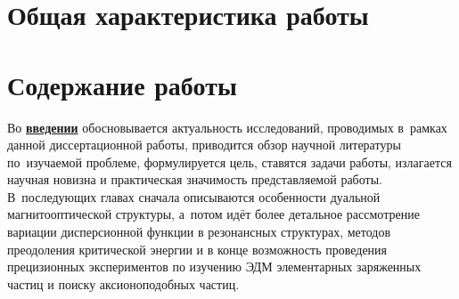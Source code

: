 \section*{Общая характеристика работы}

\newcommand{\actuality}{\pdfbookmark[1]{Актуальность}{actuality}\underline{\textbf{\actualityTXT}}}
\newcommand{\progress}{\pdfbookmark[1]{Разработанность темы}{progress}\underline{\textbf{\progressTXT}}}
\newcommand{\aim}{\pdfbookmark[1]{Цели}{aim}\underline{{\textbf\aimTXT}}}
\newcommand{\tasks}{\pdfbookmark[1]{Задачи}{tasks}\underline{\textbf{\tasksTXT}}}
\newcommand{\aimtasks}{\pdfbookmark[1]{Цели и задачи}{aimtasks}\aimtasksTXT}
\newcommand{\novelty}{\pdfbookmark[1]{Научная новизна}{novelty}\underline{\textbf{\noveltyTXT}}}
\newcommand{\influence}{\pdfbookmark[1]{Практическая значимость}{influence}\underline{\textbf{\influenceTXT}}}
\newcommand{\methods}{\pdfbookmark[1]{Методология и методы исследования}{methods}\underline{\textbf{\methodsTXT}}}
\newcommand{\defpositions}{\pdfbookmark[1]{Положения, выносимые на защиту}{defpositions}\underline{\textbf{\defpositionsTXT}}}
\newcommand{\reliability}{\pdfbookmark[1]{Достоверность}{reliability}\underline{\textbf{\reliabilityTXT}}}
\newcommand{\probation}{\pdfbookmark[1]{Апробация}{probation}\underline{\textbf{\probationTXT}}}
\newcommand{\contribution}{\pdfbookmark[1]{Личный вклад}{contribution}\underline{\textbf{\contributionTXT}}}
\newcommand{\publications}{\pdfbookmark[1]{Публикации}{publications}\underline{\textbf{\publicationsTXT}}}




\section*{Содержание работы}
Во \underline{\textbf{введении}} обосновывается актуальность
исследований, проводимых в~рамках данной диссертационной работы,
приводится обзор научной литературы по~изучаемой проблеме,
формулируется цель, ставятся задачи работы, излагается научная новизна
и практическая значимость представляемой работы. В~последующих главах
сначала описываются особенности дуальной магнитооптической структуры, а~потом идёт более детальное рассмотрение вариации дисперсионной функции в резонансных структурах, методов преодоления критической энергии и в конце возможность проведения прецизионных экспериментов по изучению ЭДМ элементарных заряженных частиц и поиску аксионоподобных частиц.

